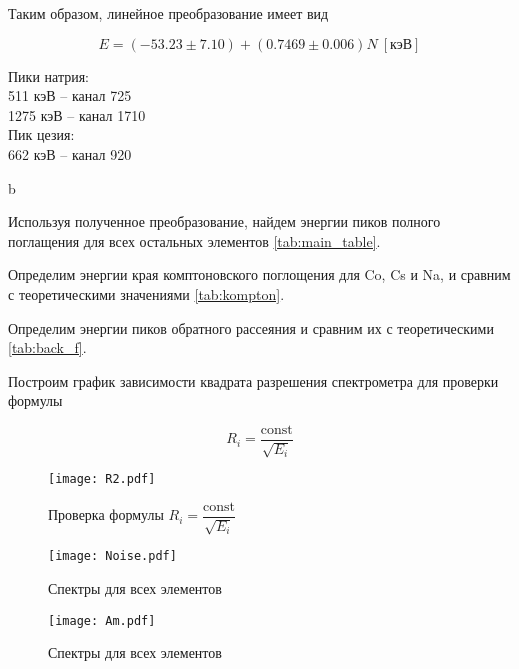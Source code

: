 	Таким образом, линейное преобразование имеет вид

	\[ E = (-53.23 \pm 7.10) + (0.7469 \pm 0.006) N ~ [\text{кэВ}] \]

	\begin{center}
		Пики натрия: \\
		511 кэВ -- канал 725 \\
		1275 кэВ -- канал 1710 \\[1 cm]
		Пик цезия: \\
		662 кэВ -- канал 920
	\end{center}b


	Используя полученное преобразование, найдем энергии пиков полного поглащения для всех остальных
	элементов \ref{tab:main_table}.

	

    Определим энергии края комптоновского поглощения для Co, Cs и Na, и сравним с теоретическими значениями \ref{tab:kompton}.

    

    Определим энергии пиков обратного рассеяния и сравним их с теоретическими \ref{tab:back_f}.

    

	Построим график зависимости квадрата разрешения спектрометра для проверки формулы

	\[ R_i = \dfrac{\mathrm{const}}{\sqrt{E_i}} \]

	\begin{figure}
		\centering
		\texttt{[image: R2.pdf]}
		\caption{Проверка формулы $R_i = \dfrac{\mathrm{const}}{\sqrt{E_i}}$}
		\label{fig:R2}
	\end{figure}

	\begin{figure}
		\centering
		\texttt{[image: Noise.pdf]}
		\caption{Спектры для всех элементов}
		\label{fig:Noise}
	\end{figure}

	\begin{figure}
		\centering
		\texttt{[image: Am.pdf]}
		\caption{Спектры для всех элементов}
		\label{fig:Am}
	\end{figure}

